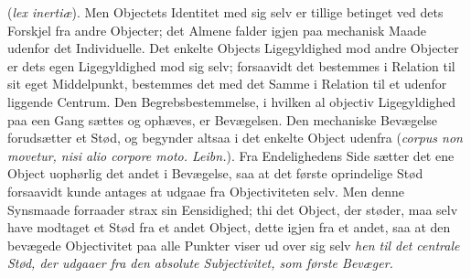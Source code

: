 \documentclass[12pt]{book}
\newcommand{\opage}[1]{\marginnote{\footnotesize\textit{[#1]}}}
\begin{document}
(\textit{lex inertiæ}). Men Objectets Identitet med sig selv er tillige betinget ved
dets Forskjel fra andre Objecter; det Almene falder igjen paa mechanisk Maade udenfor
det Individuelle. Det enkelte Objects Ligegyldighed mod andre Objecter er dets egen
Ligegyldighed
\opage{211} %
%
%
%
%
%
mod sig selv; forsaavidt det bestemmes i Relation til sit eget Middelpunkt, bestemmes
det med det Samme i Relation til et udenfor liggende Centrum. Den Begrebsbestemmelse, i
hvilken al objectiv Ligegyldighed paa een Gang sættes og ophæves, er Bevægelsen. Den
mechaniske Bevægelse forudsætter et Stød, og begynder altsaa i det enkelte Object
udenfra (\textit{corpus non movetur, nisi alio corpore moto. Leibn.}). Fra Endelighedens
Side sætter det ene Object uophørlig det andet i Bevægelse, saa at det første
oprindelige Stød forsaavidt kunde antages at udgaae fra Objectiviteten selv. Men denne
Synsmaade forraader strax sin Eensidighed; thi det Object, der støder, maa selv have
modtaget et Stød fra et andet Object, dette igjen fra et andet, saa at den bevægede
Objectivitet paa alle Punkter viser ud over sig selv \emph{hen til det centrale Stød,
der udgaaer fra den absolute Subjectivitet, som første Bevæger.}
\end{document}
